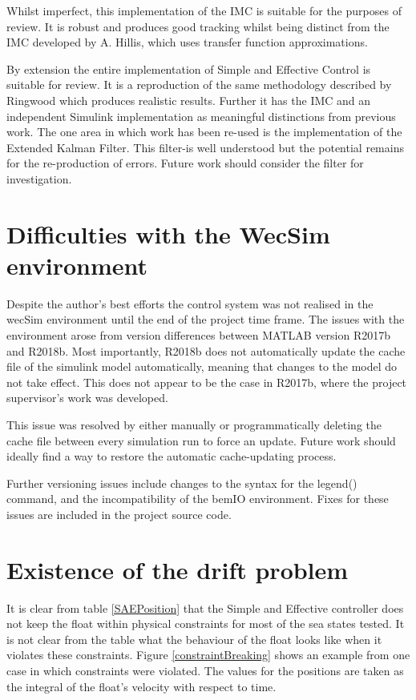 \documentclass{report}
\begin{document}
Whilst imperfect, this implementation of the IMC is suitable for the purposes of review. It is robust and produces good tracking whilst being distinct from the IMC developed by A. Hillis, which uses transfer function approximations.

By extension the entire implementation of Simple and Effective Control is suitable for review. It is a reproduction of the same methodology described by Ringwood \cite{ringwood} which produces realistic results. Further it has the IMC and an independent Simulink implementation as meaningful distinctions from previous work. The one area in which work has been re-used is the implementation of the Extended Kalman Filter. This filter-is well understood but the potential remains for the re-production of errors. Future work should consider the filter for investigation.


\section{Difficulties with the WecSim environment}
\label{difficulties}
Despite the author's best efforts the control system was not realised in the wecSim environment until the end of the project time frame. The issues with the environment arose from version differences between MATLAB version R2017b and R2018b. Most importantly, R2018b does not automatically update the cache file of the simulink model automatically, meaning that changes to the model do not take effect. This does not appear to be the case in R2017b, where the project supervisor's work was developed.

This issue was resolved by either manually or programmatically deleting the cache file between every simulation run to force an update. Future work should ideally find a way to restore the automatic cache-updating process.

Further versioning issues include changes to the syntax for the legend() command, and the incompatibility of the bemIO environment. Fixes for these issues are included in the project source code.

\section{Existence of the drift problem}

It is clear from table \ref{SAEPosition} that the Simple and Effective controller does not keep the float within physical constraints for most of the sea states tested. It is not clear from the table what the behaviour of the float looks like when it violates these constraints. Figure \ref{constraintBreaking} shows an example from one case in which constraints were violated. The values for the positions are taken as the integral of the float's velocity with respect to time.
\end{document}
